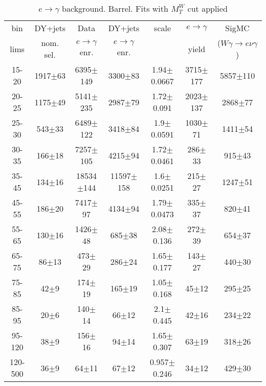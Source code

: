 \begin{table}[h]
  \scriptsize
  \begin{center}
  \caption{$e\rightarrow\gamma$ background. Barrel. Fits with $M_T^W$ cut applied} 
   \begin{tabular}{|c|c|c|c|c|c|c|}
 bin  & DY+jets    & Data                      & DY+jets & scale & $e\rightarrow\gamma$ & SigMC\\ 
 lims & nom. sel. & $e\rightarrow\gamma$ enr. & $e\rightarrow\gamma$ enr. & & yield & ($W\gamma\rightarrow e\nu\gamma$)\\ \hline
15-20 & 1917$\pm$63 & 6395$\pm$149 & 3300$\pm$83 & 1.94$\pm$0.0667& 3715$\pm$177& 5857$\pm$110 \\ \hline
20-25 & 1175$\pm$49 & 5141$\pm$235 & 2987$\pm$79 & 1.72$\pm$0.091& 2023$\pm$137& 2868$\pm$77 \\ \hline
25-30 & 543$\pm$33 & 6489$\pm$122 & 3418$\pm$84 & 1.9$\pm$0.0591& 1030$\pm$71& 1411$\pm$54 \\ \hline
30-35 & 166$\pm$18 & 7257$\pm$105 & 4215$\pm$94 & 1.72$\pm$0.0461& 286$\pm$33& 915$\pm$43 \\ \hline
35-45 & 134$\pm$16 & 18534$\pm$144 & 11597$\pm$158 & 1.6$\pm$0.0251& 215$\pm$27& 1247$\pm$51 \\ \hline
45-55 & 186$\pm$20 & 7417$\pm$97 & 4134$\pm$94 & 1.79$\pm$0.0473& 335$\pm$37& 820$\pm$41 \\ \hline
55-65 & 130$\pm$16 & 1426$\pm$48 & 685$\pm$38 & 2.08$\pm$0.136& 272$\pm$39& 654$\pm$37 \\ \hline
65-75 & 86$\pm$13 & 473$\pm$29 & 286$\pm$24 & 1.65$\pm$0.177& 143$\pm$27& 440$\pm$30 \\ \hline
75-85 & 42$\pm$9 & 174$\pm$19 & 165$\pm$19 & 1.05$\pm$0.168& 45$\pm$12& 295$\pm$25 \\ \hline
85-95 & 20$\pm$6 & 140$\pm$14 & 66$\pm$12 & 2.1$\pm$0.445& 42$\pm$16& 234$\pm$22 \\ \hline
95-120 & 38$\pm$9 & 156$\pm$16 & 94$\pm$14 & 1.65$\pm$0.307& 63$\pm$19& 318$\pm$26 \\ \hline
120-500 & 36$\pm$9 & 64$\pm$11 & 67$\pm$12 & 0.957$\pm$0.246& 34$\pm$12& 429$\pm$30 \\ \hline
  \end{tabular}
  \label{tab:EtoGAMMA_0}
  \end{center}
\end{table}


